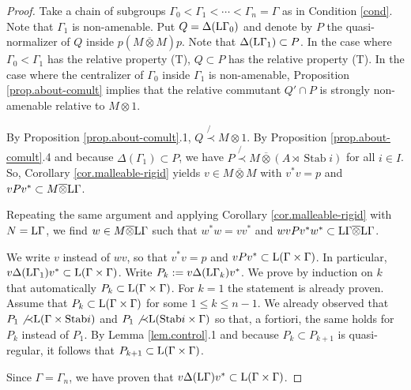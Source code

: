 \documentclass[a4paper,11pt]{amsart}
\numberwithin{equation}{section}
\begin{document}
\begin{proof}
Take a chain of subgroups $\Gamma_0 < \Gamma_1 < \cdots < \Gamma_n = \Gamma$ as in Condition \ref{cond}. Note that $\Gamma_1$ is non-amenable.
Put $Q = {\Delta}({\mathord{\text{\rm L}}} \Gamma_0)$ and denote by $P$ the quasi-normalizer of $Q$ inside $p (M {\mathbin{\overline{\otimes}}} M)p$. Note that ${\Delta}({\mathord{\text{\rm L}}} \Gamma_1) \subset P$. In the case where $\Gamma_0 < \Gamma_1$ has the relative property (T), $Q \subset P$ has the relative property (T). In the case where the centralizer of $\Gamma_0$ inside $\Gamma_1$ is non-amenable, Proposition \ref{prop.about-comult} implies that the relative commutant $Q' \cap P$ is strongly non-amenable relative to $M {\otimes} 1$.

By Proposition \ref{prop.about-comult}.1, $Q \not{\prec} M {\otimes} 1$. By Proposition \ref{prop.about-comult}.4 and because ${\Delta}(\Gamma_1) \subset P$, we have $P \not{\prec} M {\mathbin{\overline{\otimes}}} (A \rtimes {\operatorname{Stab}} i)$ for all $i \in I$. So, Corollary \ref{cor.malleable-rigid} yields $v \in M {\mathbin{\overline{\otimes}}} M$ with $v^* v = p$ and $v P v^* \subset M {\mathbin{\overline{\otimes}}} {\mathord{\text{\rm L}}} \Gamma$.

Repeating the same argument and applying Corollary \ref{cor.malleable-rigid} with $N = {\mathord{\text{\rm L}}} \Gamma$, we find $w \in M {\mathbin{\overline{\otimes}}} {\mathord{\text{\rm L}}} \Gamma$ such that $w^* w = vv^*$ and $w v P v^* w^* \subset {\mathord{\text{\rm L}}} \Gamma {\mathbin{\overline{\otimes}}} {\mathord{\text{\rm L}}} \Gamma$.

We write $v$ instead of $wv$, so that $v^* v = p$ and $v P v^* \subset {\mathord{\text{\rm L}}}(\Gamma \times \Gamma)$. In particular, $v {\Delta}({\mathord{\text{\rm L}}} \Gamma_1) v^* \subset {\mathord{\text{\rm L}}}(\Gamma \times \Gamma)$. Write $P_k := v {\Delta}({\mathord{\text{\rm L}}} \Gamma_k) v^*$. We prove by induction on $k$ that automatically $P_k \subset {\mathord{\text{\rm L}}}(\Gamma \times \Gamma)$. For $k =1$ the statement is already proven. Assume that $P_k \subset {\mathord{\text{\rm L}}}(\Gamma \times \Gamma)$ for some $1 {\leqslant} k {\leqslant} n-1$. We already observed that $P_1 \not{\prec} {\mathord{\text{\rm L}}}(\Gamma \times {\operatorname{Stab}} i)$ and $P_1 \not{\prec} {\mathord{\text{\rm L}}}({\operatorname{Stab}} i \times \Gamma)$ so that, a fortiori, the same holds for $P_k$ instead of $P_1$. By Lemma \ref{lem.control}.1 and because $P_k \subset P_{k+1}$ is quasi-regular, it follows that $P_{k+1} \subset {\mathord{\text{\rm L}}}(\Gamma \times \Gamma)$.

Since $\Gamma = \Gamma_n$, we have proven that $v {\Delta}({\mathord{\text{\rm L}}} \Gamma) v^* \subset {\mathord{\text{\rm L}}}( \Gamma \times \Gamma)$.
\end{proof}
\end{document}
